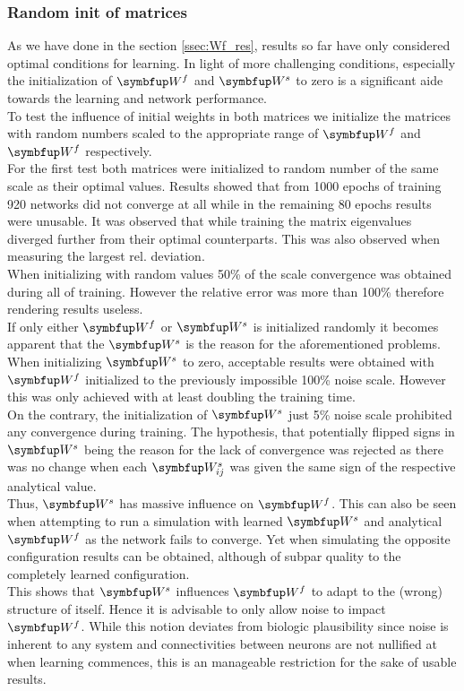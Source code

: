 \subsubsection{Random init of matrices}\label{sssec:rand_init}
As we have done in the section \cref{ssec:Wf_res}, results so far have only considered optimal conditions for learning. In light of more challenging conditions, especially the initialization of $\bmu{W}^f$ and $\bmu{W}^s$ to zero is a significant aide towards the learning and network performance.\\
To test the influence of initial weights in both matrices we initialize the matrices with random numbers scaled to the appropriate range of $\bmu{W}^f$ and $\bmu{W}^f$ respectively.\\
For the first test both matrices were initialized to random number of the same scale as their optimal values. Results showed that from 1000 epochs of training 920 networks did not converge at all while in the remaining 80 epochs results were unusable. It was observed that while training the matrix eigenvalues diverged further from their optimal counterparts. This was also observed when measuring the largest rel. deviation.\\
When initializing with random values 50\% of the scale convergence was obtained during all of training. However the relative error was more than 100\% therefore rendering results useless.\\
If only either $\bmu{W}^f$ or $\bmu{W}^s$ is initialized randomly it becomes apparent that the $\bmu{W}^s$ is the reason for the aforementioned problems. When initializing $\bmu{W}^s$ to zero, acceptable results were obtained with $\bmu{W}^f$ initialized to the previously impossible 100\% noise scale. However this was only achieved with at least doubling the training time.\\
On the contrary, the initialization of $\bmu{W}^s$ just 5\% noise scale prohibited any convergence during training. The hypothesis, that potentially flipped signs in $\bmu{W}^s$ being the reason for the lack of convergence was rejected as there was no change when each $\bmu{W}^s_{ij}$ was given the same sign of the respective analytical value.\\
Thus, $\bmu{W}^s$ has massive influence on $\bmu{W}^f$. This can also be seen when attempting to run a simulation with learned $\bmu{W}^s$ and analytical $\bmu{W}^f$ as the network fails to converge. Yet when simulating the opposite configuration results can be obtained, although of subpar quality to the completely learned configuration.\\
This shows that $\bmu{W}^s$ influences $\bmu{W}^f$ to adapt to the (wrong) structure of itself. Hence it is advisable to only allow noise to impact $\bmu{W}^f$. While this notion deviates from biologic plausibility since noise is inherent to any system and connectivities between neurons are not nullified at when learning commences, this is an manageable restriction for the sake of usable results.

